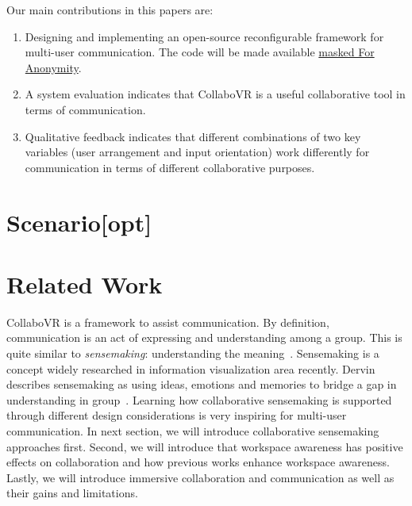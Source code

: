 \documentclass{sigchi}
\begin{document}
Our main contributions in this papers are:
\begin{enumerate}
    \item Designing and implementing an open-source reconfigurable framework for multi-user communication. The code will be made available \url{masked For Anonymity}.
    \item A system evaluation indicates that CollaboVR is a useful collaborative tool in terms of communication.
    \item Qualitative feedback indicates that different combinations of two key variables (user arrangement and input orientation) work differently for communication in terms of different collaborative purposes.
\end{enumerate}

\section{Scenario[opt]}

\section{Related Work}
CollaboVR is a framework to assist communication. By definition, communication is an act of expressing and understanding among a group. This is quite similar to \textit{sensemaking}: understanding the meaning~\cite{paul2009understanding}. Sensemaking is a concept widely researched in information visualization area recently. Dervin describes sensemaking as using ideas, emotions and memories to bridge a gap in understanding in group~\cite{dervin1992mind}. Learning how collaborative sensemaking is supported through different design considerations is very inspiring for multi-user communication. In next section, we will introduce collaborative sensemaking approaches first. Second, we will introduce that workspace awareness has positive effects on collaboration and how previous works enhance workspace awareness. Lastly, we will introduce immersive collaboration and communication as well as their gains and limitations.
\end{document}
